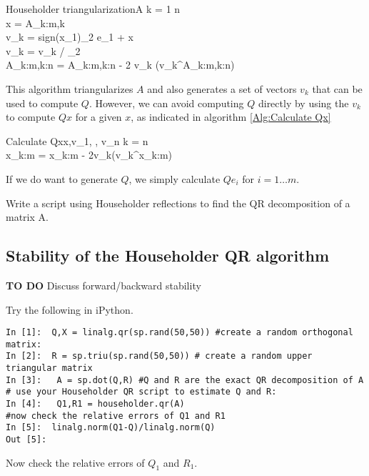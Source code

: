 \begin{pseudo}{Householder triangularization}{A}
\label{Alg:Householder triangularization}
\FOR k = 1 \TO n\\
   x = A_{k:m,k}\\
   v_k = sign(x_1)_2 e_1 + x\\
   v_k = v_k / _2\\
   A_{k:m,k:n} = A_{k:m,k:n} - 2 v_k (v_k^\ast A_{k:m,k:n})
\end{pseudo}

This algorithm triangularizes $A$ and also generates a set of vectors $v_k$ that can be used to compute $Q$. However, we can avoid computing $Q$ directly by using the $v_k$ to compute $Qx$ for a given $x$, as indicated in algorithm \ref{Alg:Calculate Qx}


\begin{pseudo}{Calculate Qx}{x,v_1, \hdots , v_n}
\label{Alg:Calculate Qx}
\FOR k = n \\
x_{k:m} = x_{k:m} - 2v_k(v_k^\ast x_{k:m})
\end{pseudo}

If we do want to generate $Q$, we simply calculate $Qe_i$ for $i = 1 \hdots m$.

\begin{problem}
Write a script using Householder reflections to find the QR decomposition of a matrix A.
\end{problem}

\subsection*{Stability of the Householder QR algorithm}


{\bf TO DO} Discuss forward/backward stability

Try the following in iPython.

\begin{lstlisting}
In [1]:  Q,X = linalg.qr(sp.rand(50,50)) #create a random orthogonal matrix:
In [2]:  R = sp.triu(sp.rand(50,50)) # create a random upper triangular matrix
In [3]:   A = sp.dot(Q,R) #Q and R are the exact QR decomposition of A
# use your Householder QR script to estimate Q and R:
In [4]:   Q1,R1 = householder.qr(A)
#now check the relative errors of Q1 and R1
In [5]:  linalg.norm(Q1-Q)/linalg.norm(Q)
Out [5]: 
\end{lstlisting}
Now check the relative errors of $Q_1$ and $R_1$.
\begin{lstlisting}

\end{lstlisting}



